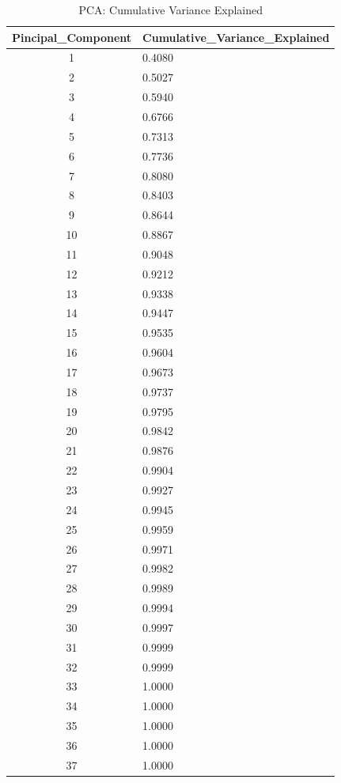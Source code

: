\documentclass[
  letterpaper,
  DIV=11,
  numbers=noendperiod]{scrreprt}
\begin{document}
\begin{table}

\caption{PCA: Cumulative Variance Explained}
\centering
\begin{tabular}[t]{c|l}
\hline
Pincipal\_Component & Cumulative\_Variance\_Explained\\
\hline
1 & 0.4080\\
\hline
2 & 0.5027\\
\hline
3 & 0.5940\\
\hline
4 & 0.6766\\
\hline
5 & 0.7313\\
\hline
6 & 0.7736\\
\hline
7 & 0.8080\\
\hline
8 & 0.8403\\
\hline
9 & 0.8644\\
\hline
10 & 0.8867\\
\hline
11 & 0.9048\\
\hline
12 & 0.9212\\
\hline
13 & 0.9338\\
\hline
14 & 0.9447\\
\hline
15 & 0.9535\\
\hline
16 & 0.9604\\
\hline
17 & 0.9673\\
\hline
18 & 0.9737\\
\hline
19 & 0.9795\\
\hline
20 & 0.9842\\
\hline
21 & 0.9876\\
\hline
22 & 0.9904\\
\hline
23 & 0.9927\\
\hline
24 & 0.9945\\
\hline
25 & 0.9959\\
\hline
26 & 0.9971\\
\hline
27 & 0.9982\\
\hline
28 & 0.9989\\
\hline
29 & 0.9994\\
\hline
30 & 0.9997\\
\hline
31 & 0.9999\\
\hline
32 & 0.9999\\
\hline
33 & 1.0000\\
\hline
34 & 1.0000\\
\hline
35 & 1.0000\\
\hline
36 & 1.0000\\
\hline
37 & 1.0000\\
\hline
\end{tabular}
\end{table}
\end{document}
